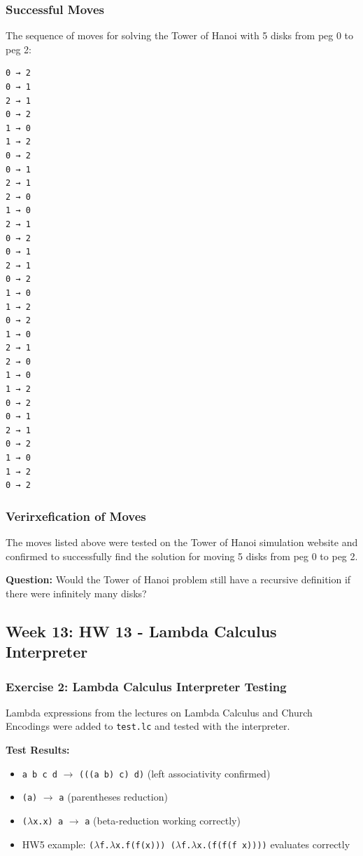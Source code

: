 \documentclass{article}
\theoremstyle{theorem}
\theoremstyle{definition}
\theoremstyle{remark}
\begin{document}
\subsubsection{Successful Moves}

The sequence of moves for solving the Tower of Hanoi with 5 disks from peg 0 to peg 2:

\begin{verbatim}
0 → 2
0 → 1
2 → 1
0 → 2
1 → 0
1 → 2
0 → 2
0 → 1
2 → 1
2 → 0
1 → 0
2 → 1
0 → 2
0 → 1
2 → 1
0 → 2
1 → 0
1 → 2
0 → 2
1 → 0
2 → 1
2 → 0
1 → 0
1 → 2
0 → 2
0 → 1
2 → 1
0 → 2
1 → 0
1 → 2
0 → 2
\end{verbatim}

\subsubsection{Verirxefication of Moves}

The moves listed above were tested on the Tower of Hanoi simulation website and confirmed to successfully find the solution for moving 5 disks from peg 0 to peg 2.

\textbf{Question:}
Would the Tower of Hanoi problem still have a recursive definition if there were infinitely many disks?

\subsection{Week 13: HW 13 - Lambda Calculus Interpreter}

\subsubsection{Exercise 2: Lambda Calculus Interpreter Testing}

Lambda expressions from the lectures on Lambda Calculus and Church Encodings were added to \texttt{test.lc} and tested with the interpreter.

\textbf{Test Results:}

\begin{itemize}
\item \texttt{a b c d} $\to$ \texttt{(((a b) c) d)} (left associativity confirmed)
\item \texttt{(a)} $\to$ \texttt{a} (parentheses reduction)
\item \texttt{($\lambda$x.x) a} $\to$ \texttt{a} (beta-reduction working correctly)
\item HW5 example: \texttt{($\lambda$f.$\lambda$x.f(f(x))) ($\lambda$f.$\lambda$x.(f(f(f x))))} evaluates correctly
\end{itemize}
\end{document}
